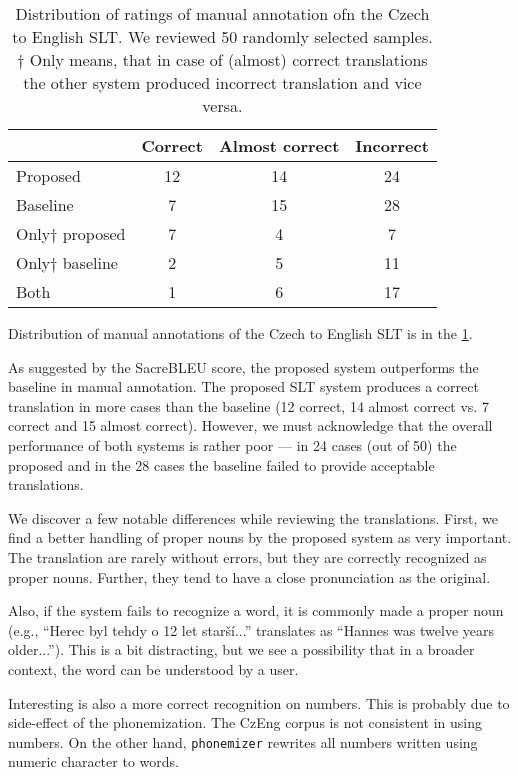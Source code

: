 \begin{table}[t]
	\centering
	\begin{tabular}{l|ccc}
		& Correct & Almost correct & Incorrect \\ \hline
		Proposed      & 12      & 14             & 24        \\
		Baseline      & 7       & 15             & 28        \\ \hline
		Only$\dagger$ proposed & 7       & 4              & 7         \\
		Only$\dagger$ baseline & 2       & 5              & 11        \\ \hline
		Both          & 1       & 6              & 17       
	\end{tabular}	
	\caption[Czech to English manual evaluation]{Distribution of ratings of manual annotation ofn the Czech to English SLT. We reviewed 50 randomly selected samples.\\$\dagger$ Only means, that in case of (almost) correct translations the other system produced incorrect translation and vice versa.}
	\label{tab:manual_cs_en}
\end{table}

Distribution of manual annotations of the Czech to English SLT is in the \cref{tab:manual_cs_en}. 

As suggested by the SacreBLEU score, the proposed system outperforms the baseline in manual annotation. The proposed SLT system produces a correct translation in more cases than the baseline (12 correct, 14 almost correct vs. 7 correct and 15 almost correct). However, we must acknowledge that the overall performance of both systems is rather poor --- in 24 cases (out of 50) the proposed and in the 28 cases the baseline failed to provide acceptable translations.

We discover a few notable differences while reviewing the translations. First, we find a better handling of proper nouns by the proposed system as very important. The translation are rarely without errors, but they are correctly recognized as proper nouns. Further, they tend to have a close pronunciation as the original.

Also, if the system fails to recognize a word, it is commonly made a proper noun (e.g., ``Herec byl tehdy o 12 let starší...'' translates as ``Hannes was twelve years older...''). This is a bit distracting, but we see a possibility that in a broader context, the word can be understood by a user.

Interesting is also a more correct recognition on numbers. This is probably due to side-effect of the phonemization. The CzEng corpus is not consistent in using numbers. On the other hand, \texttt{phonemizer} rewrites all numbers written using numeric character to words.

